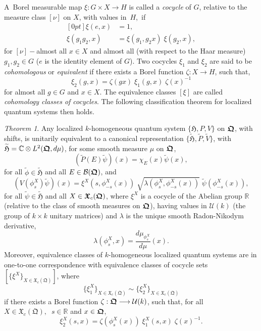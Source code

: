 \documentclass[11pt]{amsart}
\numberwithin{equation}{section}
\theoremstyle{remark}
\newcommand\HH{\mathfrak H}
\newtheorem{theorem}[defi]{Theorem}
\newcommand{\betheo}{\begin{theorem}}
\newcommand{\entheo}{\end{theorem}}
\newcommand{\be}{\begin{equation}}
\newcommand{\en}{\end{equation}}
\newcommand{\htil}{\widetilde{\mathfrak H}}
\newcommand{\bfrakQ}{\mbox{\boldmath $\mathfrak Q$}}
\newcommand{\bfrakX}{\mbox{\boldmath $\mathfrak X$}}
\begin{document}
A~Borel measurable map $\xi :G \times X \longrightarrow H$ is called a {\em
cocycle} of $G$, relative to the measure class $[\nu ]$ on $X$, with values
in~$H$,~if
\be \begin{aligned}[0pt]
  \xi (e, x ) & =  1, \\
  \xi (g_1 g_2 , x ) & =  \xi (g_1 , g_2 x )\;\xi(g_2 , x ),
\end{aligned}  \label{cocycle1}  \en
for $[\nu ]-$almost all $x \in X$ and almost all (with respect to the Haar
measure) $g_1 , g_2 \in G$ ($e$ is the identity element of $G$). Two cocycles
$\xi_1$ and $\xi_2$ are said to be {\em cohomologous} or {\em equivalent} if
there exists a Borel function $\zeta : X \longrightarrow H$, such that,
$$  \xi_2 (g, x) = \zeta (gx)\;\xi_1 (g, x)\;\zeta (x)^{-1} $$
for almost all $g \in G$ and $x \in X$. The  equivalence classes $[\xi ]$ are
called {\em cohomology classes of cocycles}. The following classification
theorem for localized quantum systems then holds.

\betheo
Any localized $k$-homogeneous quantum system $\{\HH , P, V\}$ on $\bfrakQ$,
with shifts, is unitarily equivalent to a canonical representation
$\{ \htil , \widetilde{P} , \widetilde{V}\}$, with $\htil =
{\mathbb C}\otimes L^2 (\bfrakQ , d\mu )$, for some smooth measure $\mu$ on
$\bfrakQ$,
$$ (\widetilde{P}(E)\widetilde\psi )(x) = \chi_E (x )\widetilde\psi (x), $$
for all $\widetilde\phi \in \htil$ and all $E \in {\mathcal B}(\bfrakQ )$, and
\be
  (V(\phi^X_s )\widetilde\psi )(x)= \xi^X (s, \phi^X_{-s}(x))\;
  \sqrt{\lambda (\phi^X_s , \phi^X_{-s}(x))}\; \widetilde\psi (\phi^X_{-s}(x)),
\label{grouprep1}
\en
for all $\widetilde\psi \in \htil$ and all $X \in \bfrakX_c (\bfrakQ )$, where
$\xi^X$ is a cocycle of the Abelian group $\mathbb R$ (relative to the class of
smooth measures on $\bfrakQ$), having values in ${\mathcal U}(k)$ (the group of
$k\times k$ unitary matrices) and $\lambda$ is the unique smooth Radon-Nikodym
derivative,
$$ \lambda (\phi^X_s , x ) = \frac {d\mu_{\phi^X_s}}{d\mu} (x) . $$
Moreover, equivalence classes of $k$-homogeneous localized quantum systems are
in one-to-one correspondence with equivalence classes of cocycle sets
$[\{\xi^X\}_{X \in {\mathfrak X}_c (\mathfrak Q )}]$, where
$$ \{\xi^X_1\}_{X \in {\mathfrak X}_c (\mathfrak Q )} \sim
    \{\xi^X_2\}_{X \in {\mathfrak X}_c (\mathfrak Q )} $$
if there exists a Borel function $\zeta:\bfrakQ\longrightarrow{\mathcal U}(k)$,
such that, for all $X \in {\mathfrak X}_c (\mathfrak Q ),\;\; s \in \mathbb R$
and  $x \in \bfrakQ$,
$$ \xi^X_2 (s,x ) = \zeta (\phi^X_s (x))\;\xi^X_1 (s,x)\;\zeta(x)^{-1}. $$
\entheo
\end{document}
